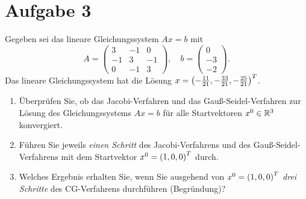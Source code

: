 \documentclass{exercise}
\begin{document}
    \section*{Aufgabe 3}
    
    \begin{problem}
        Gegeben sei das lineare Gleichungssystem \(Ax = b\) mit
        \[
            A = \begin{pmatrix}
                3 & -1 & 0\\
                -1 & 3 & -1\\
                0 & -1 & 3
            \end{pmatrix}, \quad b = \begin{pmatrix}
                0\\
                -3\\
                -2
            \end{pmatrix}.
        \]
        Das lineare Gleichungssystem hat die Lösung \(x = \parentheses*{-\frac{11}{21}, -\frac{33}{21}, -\frac{25}{21}}^T\).
        \begin{enumerate}
            \item Überprüfen Sie, ob das Jacobi-Verfahren und das Gauß-Seidel-Verfahren zur Lösung des Gleichungssystems \(Ax = b\) für alle Startvektoren \(x^0 \in \R^3\) konvergiert.
            \item Führen Sie jeweils \emph{einen Schritt} des Jacobi-Verfahrens und des Gauß-Seidel-Verfahrens mit dem Startvektor \(x^0 = \parentheses*{1, 0, 0}^T\) durch.
            \item Welches Ergebnis erhalten Sie, wenn Sie ausgehend von \(x^0 = \parentheses*{1, 0, 0}^T\) \emph{drei Schritte} des CG-Verfahrens durchführen (Begründung)?
        \end{enumerate}
    \end{problem}
    
\end{document}
